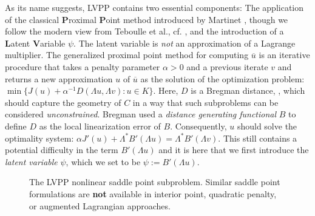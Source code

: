 \documentclass[aspectratio=169,xcolor=dvipsnames,11pt]{beamer}
\begin{document}
\begin{frame}
As its name suggests, LVPP contains two essential components: The application of the classical \textbf{P}roximal \textbf{P}oint method introduced by Martinet \cite{BMartinet_1970}, though we follow the modern view from Teboulle et al., cf. \cite{MTeboulle_2018}, and the introduction of a \textbf{L}atent \textbf{V}ariable $\psi$. The latent variable is \textit{not} an approximation of a Lagrange multiplier. The generalized proximal point method for computing $\overline{u}$ is an iterative procedure that takes a penalty parameter $\alpha > 0$ and a previous iterate $v$ and returns a new approximation $u$ of $\overline{u}$  as the solution of the optimization problem: 
$
\min\{ J(u) + \alpha^{-1} D(\Lambda u,\Lambda v) : u \in K\}.
$ 
Here, $D$ is a Bregman distance, \cite{BREGMAN1967200},  which should capture the geometry of $C$ in a way that such subproblems can be considered \textit{unconstrained}. Bregman used a \textit{distance generating functional} $B$  to define $D$ as the local linearization error of $B$. Consequently, $u$ should solve the optimality system:
$
\alpha J'(u) + \Lambda^* B'(\Lambda u) = \Lambda^* B'(\Lambda v).
$
This still contains a potential difficulty in the term $B'(\Lambda u)$ and it is here that we first introduce the \textit{latent variable} $\psi$, which we set to be $\psi := B'(\Lambda u)$.  

\begin{figure}
\vspace{-3ex}
\caption{The LVPP nonlinear saddle point subproblem. Similar saddle point formulations are \textbf{not} available in interior point, quadratic penalty, or augmented Lagrangian approaches.}
\label{fig:lvpp-spp}
\end{figure}


\end{frame}
\end{document}
